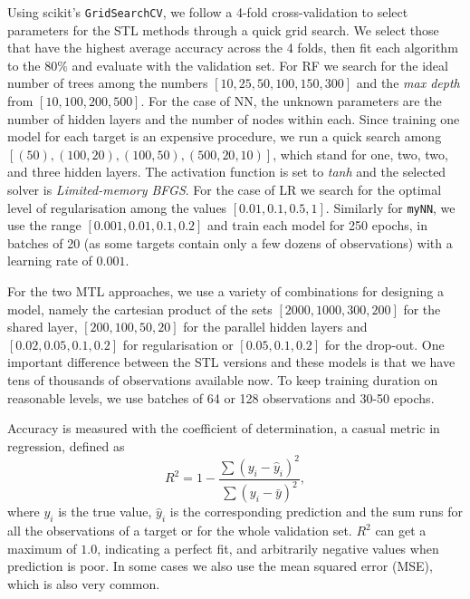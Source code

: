\documentclass[10pt]{article}
\begin{document}
Using scikit's \texttt{GridSearchCV}, we follow a 4-fold cross-validation to select parameters for the STL methods through a quick grid search. We select those that have the highest average accuracy across the 4 folds, then fit each algorithm to the $80\%$ and evaluate with the validation set. For RF we search for the ideal number of trees among the numbers $[10,25,50,100,150,300]$ and the \textit{max depth} from $[10,100,200,500]$. For the case of NN, the unknown parameters are the number of hidden layers and the number of nodes within each. Since training one model for each target is an expensive procedure, we run a quick search among $[(50),(100,20),(100,50),(500,20,10)]$, which stand for one, two, two, and three hidden layers. The activation function is set to \textit{tanh}  and the selected solver is \textit{Limited-memory BFGS}. For the case of LR we search for the optimal level of regularisation among the values $[0.01,0.1,0.5,1]$. Similarly for \texttt{myNN}, we use the range $[0.001,0.01,0.1, 0.2]$ and train each model for 250 epochs, in batches of 20 (as some targets contain only a few dozens of observations) with a learning rate of $0.001$.

For the two MTL approaches, we use a variety of combinations for designing a model, namely the cartesian product of the sets $[2000,1000,300,200]$ for the shared layer, $[200,100,50,20]$ for the parallel hidden layers and $[0.02, 0.05, 0.1, 0.2]$ for regularisation or $[0.05, 0.1, 0.2]$ for the drop-out. One important difference between the STL versions and these models is that we have tens of thousands of observations available now. To keep training duration on reasonable levels, we use batches of 64 or 128 observations and 30-50 epochs.

Accuracy is measured with the coefficient of determination, a casual metric in regression, defined as 
\[ R^2 = 1 - \frac{ \sum (y_i - \hat{y}_i)^2 }{ \sum (y_i - \bar{y})^2}, \]
where $y_i$ is the true value, $\hat{y}_i$ is the corresponding prediction and the sum runs for all the observations of a target or for the whole validation set. $R^2$ can get a maximum of $1.0$, indicating a perfect fit, and arbitrarily negative values when prediction is poor. In some cases we also use the mean squared error (MSE), which is also very common. 

\end{document}
